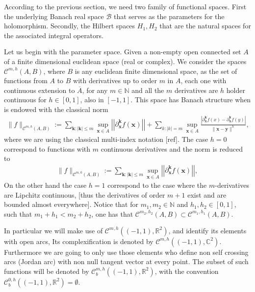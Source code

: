 \documentclass{article}
\newcommand{\todo}[1]{{\color{red}[#1]}}
\newcommand{\IC}{{\mathbb C}}
\newcommand{\IN}{{\mathbb N}}
\newcommand{\IR}{{\mathbb R}}
\newcommand{\cmspaceh}[4]{\mathcal{C}^{#1,#2} \left( #3, #4 \right)}
\newcommand{\rgeoh}[2]{\mathcal{C}_b^{#1,#2}\left( (-1,1), \IR^2 \right)}
\newcommand{\bk}{\bm{k}}
\newcommand{\bx}{\bm{x}}
\newcommand{\by}{\bm{y}}
\begin{document}
According to the previous section, we need two family of functional spaces. First the underlying Banach real space $\mathcal{B}$ that serves as the parameters for the holomorphism. Secondly, the Hilbert spaces $H_1,H_2$ that are the natural spaces for the associated integral operators. 

Let us begin with the parameter space. Given a non-empty open connected set $A$ of a finite dimensional euclidean space (real or complex). We consider the spaces $\cmspaceh{m}{h}{A}{B}$, where $B$ is any euclidean finite dimensional space, as the set of functions from $A$ to $B$ with derivatives up to order $m$ in $A$, each one with continuous extension to $\overline{A}$, for any $m \in \IN$ and all the $m$ derivatives are $h$ holder continuous for $h \in [0,1]$, also in $[-1,1]$. This space has Banach structure when is endowed with the classical norm 
\begin{align*}
\| f \|_{\cmspaceh{m}{h}{A}{B}} := \sum_{\bk: |\bk| \leq m } \sup_{\bx \in A}  \left\vert\left\vert\partial_{\bx}^{\bk} f(\bx) \right\vert\right\vert+ \sum_{k: |k| =m} \sup_{\bx \in A}  \frac{|\partial_{\bx}^{\bk}f(x)-\partial_{\bx}^{\bk}f(y)|}{\| \bx - \by\|^h},
\end{align*}
where we are using the classical multi-index notation \todo{ref}.  The case $h=0$ correspond to functions with $m$ continuous derivatives and the norm is reduced to 
\begin{align*}
\| f \|_{\cmspaceh{m}{0}{A}{B}} := \sum_{\bk: |\bk| \leq m } \sup_{\bx \in A}  \left\vert\left\vert\partial_{\bx}^{\bk} f(\bx) \right\vert\right\vert,
\end{align*}
On the other hand the case $h=1$ correspond to the case where the $m$-derivatives are Lipchitz continuous, \todo{thus the derivatives of order $m+1$ exist and are bounded almost everywhere}. Notice that for $m_1, m_2 \in \IN$ and $h_1, h_2 \in [0,1]$, such that $m_1 + h_1 < m_2 + h_2$, one has that $\cmspaceh{m_2}{h_2}{A}{B} \subset \cmspaceh{m_1}{h_1}{A}{B}$.

In particular we will make use of $\cmspaceh{m}{h}{(-1,1)}{\IR^2}$, and identify its elements with open arcs, Its complexification is denoted by $\cmspaceh{m}{h}{(-1,1)}{\IC^2}$. Furthermore we are going to only use those elements who define non self crossing arcs (Jordan arc) with non null tangent vector at every point. The subset of such functions will be denoted by $\rgeoh{m}{h}$, with the convention $\rgeoh{0}{h}  = \emptyset$.
\end{document}
